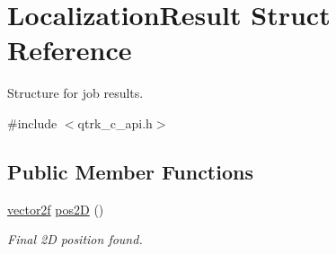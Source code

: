 \hypertarget{struct_localization_result}{}\section{Localization\+Result Struct Reference}
\label{struct_localization_result}


Structure for job results.  




{\ttfamily \#include $<$qtrk\+\_\+c\+\_\+api.\+h$>$}

\subsection*{Public Member Functions}
\begin{DoxyCompactItemize}
\item 
\hyperlink{std__incl_8h_aba974726076ec2d63a67114c536d123e}{vector2f} \hyperlink{struct_localization_result_a40b7da4cbde78ccc9a013b1bcc608e60}{pos2D} ()
\begin{DoxyCompactList}\small\item\em Final 2D position found. \end{DoxyCompactList}\end{DoxyCompactItemize}
